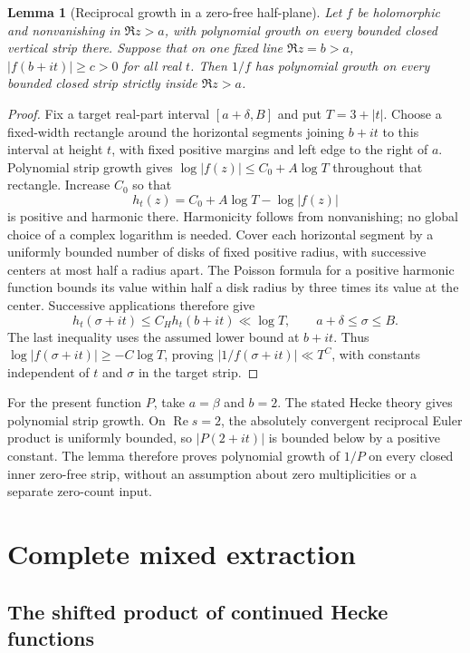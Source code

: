 \documentclass[11pt]{article}
\numberwithin{equation}{section}
\newcommand{\Rea}{\operatorname{Re}}
\newtheorem{lemma}[theorem]{Lemma}
\begin{document}
\begin{lemma}[Reciprocal growth in a zero-free half-plane]
\label{am:reciprocal-growth}
Let \(f\) be holomorphic and nonvanishing in \(\Re z>a\), with
polynomial growth on every bounded closed vertical strip there.
Suppose that on one fixed line \(\Re z=b>a\),
\(|f(b+it)|\ge c>0\) for all real \(t\). Then \(1/f\) has
polynomial growth on every bounded closed strip strictly inside
\(\Re z>a\).
\end{lemma}
\begin{proof}
Fix a target real-part interval \([a+\delta,B]\) and put
\(T=3+|t|\). Choose a fixed-width rectangle around the horizontal
segments joining \(b+it\) to this interval at height \(t\),
with fixed positive margins and left edge to the right of \(a\).
Polynomial strip growth gives
\(\log|f(z)|\le C_0+A\log T\) throughout that rectangle.
Increase \(C_0\) so that
\[
 h_t(z)=C_0+A\log T-\log|f(z)|
\]
is positive and harmonic there. Harmonicity follows from
nonvanishing; no global choice of a complex logarithm is needed.
Cover each horizontal segment by a uniformly bounded number of
disks of fixed positive radius, with successive centers at most
half a radius apart. The Poisson formula for a positive harmonic
function bounds its value within half a disk radius by three times
its value at the center. Successive applications therefore give
\[
 h_t(\sigma+it)\le C_Hh_t(b+it)\ll\log T,
 \qquad a+\delta\le\sigma\le B.
\]
The last inequality uses the assumed lower bound at \(b+it\).
Thus \(\log|f(\sigma+it)|\ge-C\log T\), proving
\(|1/f(\sigma+it)|\ll T^C\), with constants independent of
\(t\) and \(\sigma\) in the target strip.
\end{proof}

For the present function $P$, take $a=\beta$ and $b=2$.
The stated Hecke theory gives polynomial strip growth. On
$\Rea s=2$, the absolutely convergent reciprocal Euler product
is uniformly bounded, so $|P(2+it)|$ is bounded below by a
positive constant. The lemma therefore proves polynomial growth
of $1/P$ on every closed inner zero-free strip, without an
assumption about zero multiplicities or a separate zero-count input.

\section{Complete mixed extraction}

\subsection{The shifted product of continued Hecke functions}
\end{document}
